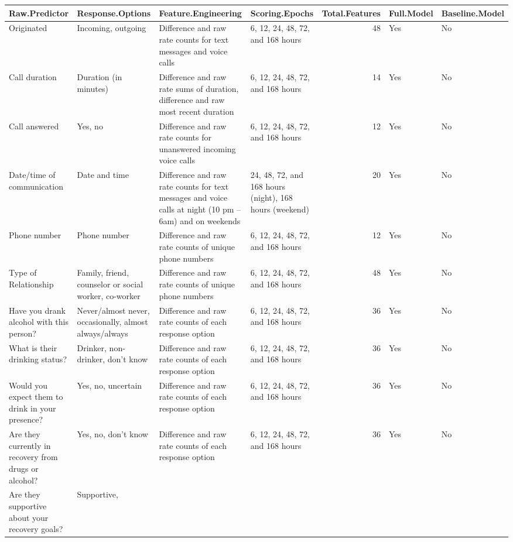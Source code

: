 \documentclass[
  letterpaper,
  DIV=11,
  numbers=noendperiod]{scrartcl}
\begin{document}
\begin{longtable}[]{@{}llllrll@{}}

\toprule\noalign{}
Raw.Predictor & Response.Options & Feature.Engineering & Scoring.Epochs
& Total.Features & Full.Model & Baseline.Model \\
\midrule\noalign{}
\endhead
\bottomrule\noalign{}
\endlastfoot
Originated & Incoming, outgoing & Difference and raw rate counts for
text messages and voice calls & 6, 12, 24, 48, 72, and 168 hours & 48 &
Yes & No \\
Call duration & Duration (in minutes) & Difference and raw rate sums of
duration, difference and raw most recent duration & 6, 12, 24, 48, 72,
and 168 hours & 14 & Yes & No \\
Call answered & Yes, no & Difference and raw rate counts for unanswered
incoming voice calls & 6, 12, 24, 48, 72, and 168 hours & 12 & Yes &
No \\
Date/time of communication & Date and time & Difference and raw rate
counts for text messages and voice calls at night (10 pm -- 6am) and on
weekends & 24, 48, 72, and 168 hours (night), 168 hours (weekend) & 20 &
Yes & No \\
Phone number & Phone number & Difference and raw rate counts of unique
phone numbers & 6, 12, 24, 48, 72, and 168 hours & 12 & Yes & No \\
Type of Relationship & Family, friend, counselor or social worker,
co-worker & Difference and raw rate counts of unique phone numbers & 6,
12, 24, 48, 72, and 168 hours & 48 & Yes & No \\
Have you drank alcohol with this person? & Never/almost never,
occasionally, almost always/always & Difference and raw rate counts of
each response option & 6, 12, 24, 48, 72, and 168 hours & 36 & Yes &
No \\
What is their drinking status? & Drinker, non-drinker, don't know &
Difference and raw rate counts of each response option & 6, 12, 24, 48,
72, and 168 hours & 36 & Yes & No \\
Would you expect them to drink in your presence? & Yes, no, uncertain &
Difference and raw rate counts of each response option & 6, 12, 24, 48,
72, and 168 hours & 36 & Yes & No \\
Are they currently in recovery from drugs or alcohol? & Yes, no, don't
know & Difference and raw rate counts of each response option & 6, 12,
24, 48, 72, and 168 hours & 36 & Yes & No \\
Are they supportive about your recovery goals? & Supportive,

\end{longtable}
\end{document}
